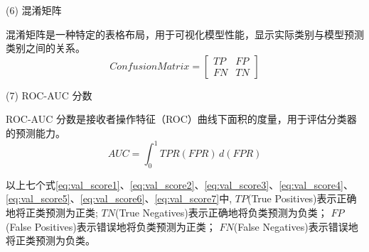 (6) 混淆矩阵\par
混淆矩阵是一种特定的表格布局，用于可视化模型性能，显示实际类别与模型预测类别之间的关系。
\begin{equation}
  \label{eq:val_score6}
  Confusion Matrix = \begin{bmatrix} TP & FP \\ FN & TN \end{bmatrix}
\end{equation}

(7) ROC-AUC 分数\par
ROC-AUC 分数是接收者操作特征（ROC）曲线下面积的度量，用于评估分类器的预测能力。
\begin{equation}
  \label{eq:val_score7}
  AUC = \int_{0}^{1} TPR(FPR) \, d(FPR)
\end{equation}

以上七个式\ref{eq:val_score1}、\ref{eq:val_score2}、\ref{eq:val_score3}、\ref{eq:val_score4}、\ref{eq:val_score5}、\ref{eq:val_score6}、\ref{eq:val_score7}中,
  $TP$(True Positives)表示正确地将正类预测为正类;
  $TN$(True Negatives)表示正确地将负类预测为负类；
  $FP$(False Positives)表示错误地将负类预测为正类；
  $FN$(False Negatives)表示错误地将正类预测为负类。








